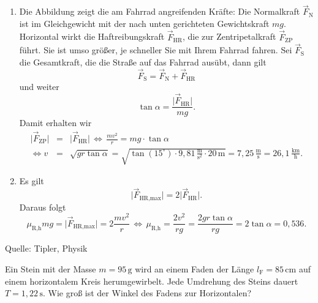 \begin{MExercises}
\begin{MExercise}
  \begin{MSolution}
  \begin{enumerate}
  \item Die Abbildung zeigt die am Fahrrad angreifenden Kr\"afte: Die Normalkraft $\vec{F}_{\textrm{N}}$ ist im Gleichgewicht mit der nach unten gerichteten Gewichtskraft $mg$. Horizontal wirkt die Haftreibungskraft $\vec{F}_{\textrm{HR}}$, die zur Zentripetalkraft  $\vec{F}_{\textrm{ZP}}$ f\"uhrt. Sie ist umso gr\"o{\ss}er, je schneller Sie mit Ihrem Fahrrad fahren. Sei $\vec{F}_{\textrm{S}}$ die Gesamtkraft, die die Stra{\ss}e auf das Fahrrad aus\"ubt, dann gilt
  \begin{equation*}
  \vec{F}_{\textrm{S}}=\vec{F}_{\textrm{N}}+\vec{F}_{\textrm{HR}}
  \end{equation*} und weiter
  \begin{equation*}
  \tan \alpha=\frac{\vert\vec{F}_{\textrm{HR}}\vert}{mg}.
  \end{equation*} Damit erhalten wir
  \begin{eqnarray*}
  \vert\vec{F}_{\textrm{ZP}}\vert&=&\vert\vec{F}_{\textrm{HR}}\vert\,\Leftrightarrow\, \frac{mv^2}{r}=mg\cdot\tan \alpha\\
  \Leftrightarrow v&=&\sqrt{gr\tan\alpha }=\sqrt{\tan (15^{\circ})\cdot 9{,}81\,\frac{\text{m}}{\text{s}^2}\cdot 20\,\text{m}}=7{,}25\,\frac{\text{m}}{\text{s}}=26{,}1\,\frac{\text{km}}{\text{h}}.
  \end{eqnarray*}
  \item Es gilt 
  \begin{equation*}
  \vert\vec{F}_{\textrm{HR,max}}\vert=2\vert\vec{F}_{\textrm{HR}}\vert.
  \end{equation*} Daraus folgt
  \begin{equation}
  \mu_{\textrm{R,h}}mg=\vert\vec{F}_{\textrm{HR,max}}\vert=2\frac{mv^2}{r}\,\Leftrightarrow\, \mu_{\textrm{R,h}}=\frac{2v^2}{rg}=\frac{2gr\tan \alpha}{rg}=2\tan \alpha=0{,}536.
  \end{equation}
  \end{enumerate}
  \end{MSolution}
  Quelle: Tipler, Physik
  \end{MExercise}
  \begin{MExercise}
  Ein Stein mit der Masse $m= 95\,\text{g}$ wird an einem Faden der L\"ange $l_{\textrm{F}}=85\,\text{cm}$ auf einem horizontalem Kreis herumgewirbelt. Jede Umdrehung des Steins dauert $T=1{,}22\,\text{s}$. Wie gro{\ss} ist der Winkel des Fadens zur Horizontalen?
  

\end{MExercise}
\end{MExercises}
